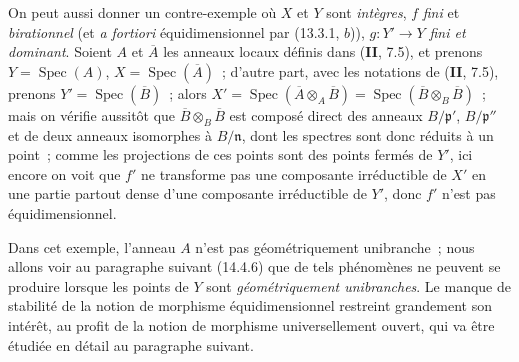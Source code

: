 \begin{remark}[13.3.9]
On peut aussi donner un contre-exemple où $X$ et $Y$ sont \emph{intègres}, $f$
\emph{fini} et \emph{birationnel} (et \emph{a fortiori} équidimensionnel par
(13.3.1, $b$)), $g:Y'\to Y$ \emph{fini et dominant}. Soient $A$ et
$\overline A$ les anneaux locaux définis dans (\textbf{II}, 7.5), et prenons
$Y=\operatorname{Spec}(A)$, $X=\operatorname{Spec}(\overline A)$~; d'autre
part, avec les notations de (\textbf{II}, 7.5), prenons
$Y'=\operatorname{Spec}(\overline B)$~; alors
$X'=\operatorname{Spec}(\overline A\otimes_A\overline B)
=\operatorname{Spec}(\overline B\otimes_B\overline B)$~; mais on vérifie
aussitôt que $\overline B\otimes_B\overline B$ est composé direct des anneaux
$B/\mathfrak p'$, $B/\mathfrak p''$ et de deux anneaux isomorphes à
$B/\mathfrak n$, dont les spectres sont donc réduits à un point~; comme les
projections de ces points sont des points fermés de $Y'$, ici encore on voit
que $f'$ ne transforme pas une composante irréductible de $X'$ en une partie
partout dense d'une composante irréductible de $Y'$, donc $f'$ n'est pas
équidimensionnel.

Dans cet exemple, l'anneau $A$ n'est pas géométriquement unibranche~; nous
allons voir au paragraphe suivant (14.4.6) que de tels phénomènes ne peuvent se
produire lorsque les points de $Y$ sont \emph{géométriquement unibranches}. Le
manque de stabilité de la notion de morphisme équidimensionnel restreint
grandement son intérêt, au profit de la notion de morphisme universellement
ouvert, qui va être étudiée en détail au paragraphe suivant.
\end{remark}


